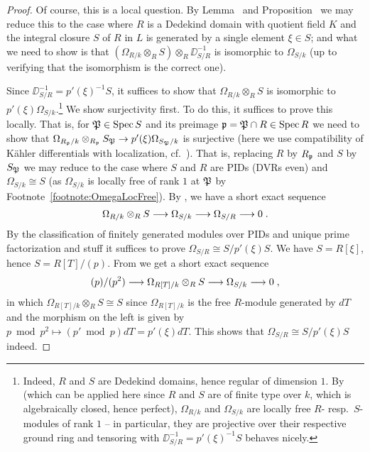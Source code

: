 \documentclass[a4paper,parskip=half,numbers=enddot, DIV=12]{scrreprt}
\begin{document}
\begin{proof}
	Of course, this is a local question. By Lemma~ and Proposition~ we may reduce this to the case where $R$ is a Dedekind domain with quotient field $K$ and the integral closure $S$ of $R$ in $L$ is generated by a single element $\xi\in S$; and what we need to show is that $(\Omega_{R/k}\otimes_RS)\otimes_R\DD_{S/R}^{-1}$ is isomorphic to $\Omega_{S/k}$ (up to verifying that the isomorphism is the correct one).
	
	Since $\DD_{S/R}^{-1}=p'(\xi)^{-1}S$, it suffices to show that $\Omega_{R/k}\otimes_RS$ is isomorphic to $p'(\xi)\Omega_{S/k}$.\footnote{Indeed, $R$ and $S$ are Dedekind domains, hence regular of dimension $1$. By \cite[Proposition~1.6.3]{alg2} (which can be applied here since $R$ and $S$ are of finite type over $k$, which is algebraically closed, hence perfect), $\Omega_{R/k}$ and $\Omega_{S/k}$ are locally free $R$- resp.\ $S$-modules of rank $1$ -- in particular, they are projective over their respective ground ring and tensoring with $\DD_{S/R}^{-1}=p'(\xi)^{-1}S$ behaves nicely.} We show surjectivity first. To do this, it suffices to prove this locally. That is, for $\mathfrak{P}\in\operatorname{Spec} S$ and its preimage $\mathfrak{p}=\mathfrak{P}\cap R\in\operatorname{Spec} R$ we need to show that $\Omega_{R_\pp/k}\otimes_{R_\pp}S_\PP\morphism p'(\xi)\Omega_{S_\PP/k}$ is surjective (here we use compatibility of Kähler differentials with localization, cf.\ \cite[Corollary~1.4.1a]{alg2}). That is, replacing $R$ by $R_{\mathfrak{p}}$ and $S$ by $S_{\mathfrak{P}}$ we may reduce to the case where $S$ and $R$ are PIDs (DVRs even) and $\Omega_{S/k}\cong S$ (as $\Omega_{S/k}$ is locally free of rank $1$ at $\mathfrak{P}$ by Footnote~\ref{footnote:OmegaLocFree}). By \cite[Corollary~1.4.1]{alg2}, we have a short exact sequence
	\begin{align*}
		\Omega_{R/k}\otimes_RS\morphism\Omega_{S/k}\morphism\Omega_{S/R}\morphism 0\;.
	\end{align*}
	By the classification of finitely generated modules over PIDs and unique prime factorization and stuff it suffices to prove $\Omega_{S/R}\cong S/p'(\xi)S$. We have $S=R[\xi]$, hence $S=R[T]/(p)$. From \cite[Corollary~1.4.1]{alg2} we get a short exact sequence
	\begin{align*}
		(p)/(p^2)\morphism\Omega_{R[T]/k}\otimes_RS\morphism\Omega_{S/k}\morphism 0\;,
	\end{align*}
	in which $\Omega_{R[T]/k}\otimes_RS\cong S$ since $\Omega_{R[T]/k}$ is the free $R$-module generated by $dT$ and the morphism on the left is given by $p\bmod p^2\mapsto (p'\bmod p)dT=p'(\xi)dT$. This shows that $\Omega_{S/R}\cong S/p'(\xi)S$ indeed.
	

\end{proof}
\end{document}
